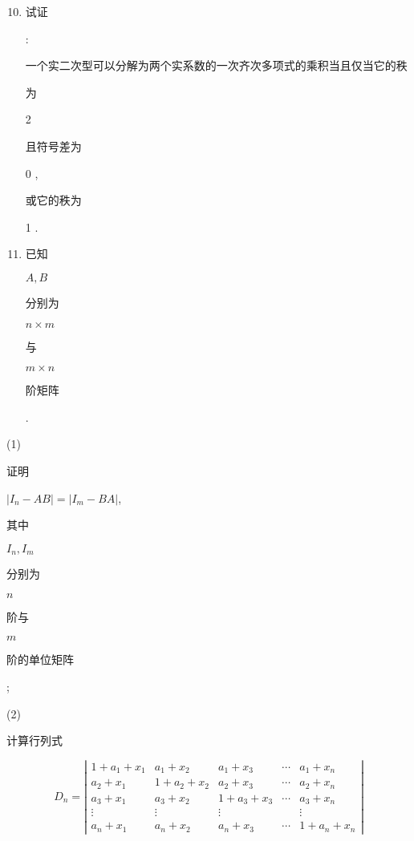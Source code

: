 \documentclass[10pt]{article}
\begin{document}
\begin{enumerate}
  \setcounter{enumi}{9}
  \item \begin{CJK}{UTF8}{mj}试证\end{CJK}: \begin{CJK}{UTF8}{mj}一个实二次型可以分解为两个实系数的一次齐次多项式的乘积当且仅当它的秩\end{CJK} \begin{CJK}{UTF8}{mj}为\end{CJK} 2 \begin{CJK}{UTF8}{mj}且符号差为\end{CJK} 0 , \begin{CJK}{UTF8}{mj}或它的秩为\end{CJK} 1 .

  \item \begin{CJK}{UTF8}{mj}已知\end{CJK} $A, B$ \begin{CJK}{UTF8}{mj}分别为\end{CJK} $n \times m$ \begin{CJK}{UTF8}{mj}与\end{CJK} $m \times n$ \begin{CJK}{UTF8}{mj}阶矩阵\end{CJK}.

\end{enumerate}
(1) \begin{CJK}{UTF8}{mj}证明\end{CJK} $\left|I_{n}-A B\right|=\left|I_{m}-B A\right|$, \begin{CJK}{UTF8}{mj}其中\end{CJK} $I_{n}, I_{m}$ \begin{CJK}{UTF8}{mj}分别为\end{CJK} $n$ \begin{CJK}{UTF8}{mj}阶与\end{CJK} $m$ \begin{CJK}{UTF8}{mj}阶的单位矩阵\end{CJK};

(2) \begin{CJK}{UTF8}{mj}计算行列式\end{CJK}
$$
D_{n}=\left|\begin{array}{ccccc}
1+a_{1}+x_{1} & a_{1}+x_{2} & a_{1}+x_{3} & \cdots & a_{1}+x_{n} \\
a_{2}+x_{1} & 1+a_{2}+x_{2} & a_{2}+x_{3} & \cdots & a_{2}+x_{n} \\
a_{3}+x_{1} & a_{3}+x_{2} & 1+a_{3}+x_{3} & \cdots & a_{3}+x_{n} \\
\vdots & \vdots & \vdots & & \vdots \\
a_{n}+x_{1} & a_{n}+x_{2} & a_{n}+x_{3} & \cdots & 1+a_{n}+x_{n}
\end{array}\right|
$$
\end{document}
